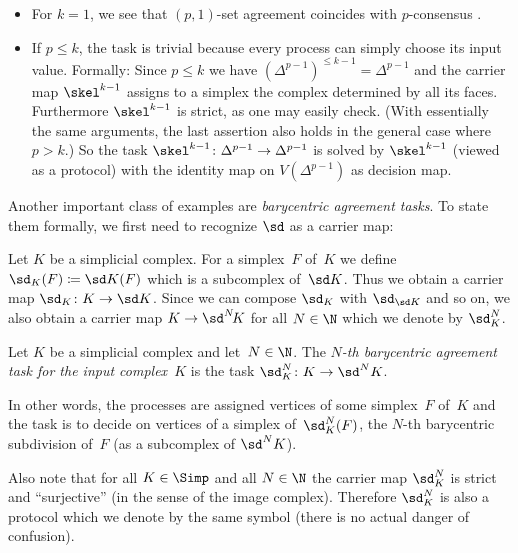\begin{thExample}
\begin{itemize}
        \item
            For $k=1$, we see that $(p,1)$-set agreement coincides with
            $p$-consensus .
            
        \item
            If $p\leq k$, the task is trivial because every process can simply
            choose its input value. Formally: Since $p\leq k$ we have
            $(\Delta^{p-1})^{\leq k-1} = \Delta^{p-1}$ and the carrier map
            $\skel^{k-1}$ assigns to a simplex the complex determined by all its
            faces. Furthermore $\skel^{k-1}$ is strict, as one may easily check.
            (With essentially the same arguments, the last assertion also holds
            in the general case where $p > k$.) So the task
            $\skel^{k-1}\colon\Delta^{p-1}\to\Delta^{p-1}$ is solved by
            $\skel^{k-1}$ (viewed as a protocol) with the identity map
            on $V(\Delta^{p-1})$ as decision map.
    \end{itemize}
\end{thExample}

Another important class of examples are \emph{barycentric agreement tasks}. To
state them formally, we first need to recognize $\sd$ 
as a carrier map:

\vfill %

\pagebreak[2]\noindent
Let $K$ be a simplicial complex. For a simplex~$F$ of~$K$ we define
$\sd_K(F) \defeq \sd K(F)$ which is a subcomplex of~$\sd K$. Thus we
obtain a carrier map $\sd_K\colon K\to\sd K$. Since we can compose
$\sd_K$ with $\sd_{\sd K}$ and so on, we also obtain a carrier map
$K\to\sd^N\!K$ for all $N\in\N$ which we denote by $\sd_K^N$.

\begin{thExample}
    \label{ch2:barycentricagreement}
    \;Let $K$ be a simplicial complex and let~$N\in\N$. The
    \emph{$N$-th barycentric agreement task for the input complex~$K$}
    is the task $\sd_K^N\colon K\to\sd^N K$.
    
    In other words, the processes are assigned vertices of some simplex~$F$
    of~$K$ and the task is to decide on vertices of a simplex
    of~$\sd_K^N(F)$, the $N$-th barycentric subdivision of~$F$
    (as a subcomplex of $\sd^N K$).
\end{thExample}

Also note that for all $K\in\Simp$ and all $N\in\N$ the carrier map
$\sd_K^N$ is strict and \enquote{surjective} (in the sense of the image
complex). Therefore $\sd_K^N$ is also a protocol which we denote by
the same symbol (there is no actual danger of confusion).


